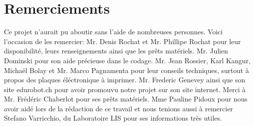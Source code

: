 \documentclass[a4paper,12pt]{report}
\begin{document}
{\clearpage

\section*{Remerciements}
Ce projet n'aurait pu aboutir sans l'aide de nombreuses personnes. Voici l'occasion de les remercier: Mr. Denis Rochat et Mr. Phillipe Rochat pour leur disponibilité, leurs renseignements ainsi que les prêts matériels. Mr. Julien Dominski pour son aide précieuse dans le codage. Mr. Jean Rossier, Karl Kangur, Michaël Bolay et Mr. Marco Pagnamenta pour leur conseils techniques, surtout à propos des plaques éléctronique à imprimer. Mr. Frederic Genevey ainsi que son site edurobot.ch pour avoir promouvu notre projet sur son site internet. Merci à Mr. Frédéric Chaberlot pour ses prêts matériels. Mme Pauline Pidoux pour nous avoir aidé lors de la rédaction de ce travail et nous tenions aussi à remercier Stefano Varricchio, du Laboratoire LIS pour ses informations très utiles.

}
\end{document}
